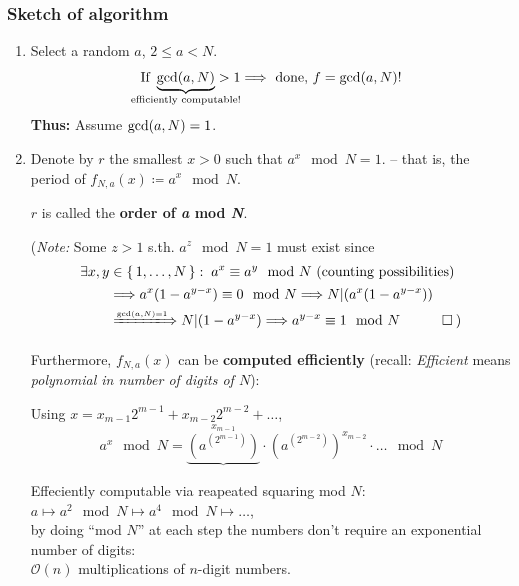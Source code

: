 \documentclass[a4paper, 12pt]{article}
\theoremstyle{plain}
\theoremstyle{definition}
\theoremstyle{remark}
\begin{document}
\subsubsection*{Sketch of algorithm}
\begin{enumerate}[label=(\arabic*)]
  \item Select a random $a$, $2\leq a<N$.
    \begin{equation*}
      \text{If } \underbrace{\textnormal{gcd}(a,N)}_{\mathclap{\text{efficiently computable!}}} > 1 \Longrightarrow \text{ done, } f=\textnormal{gcd}(a,N)!
    \end{equation*}
    \textbf{Thus:} Assume $\textnormal{gcd}(a,N)=1$.
  \item Denote by $r$ the smallest $x>0$ such that $a^x \mod N = 1$.
    -- that is, the period of $f_{N,a}(x)\coloneq a^x \mod N$.

    $r$ is called the \textbf{order of \emph{a} mod \emph{N}}.

    (\emph{Note:} Some $z>1$ s.th. $a^z \mod N = 1$ must exist since
      \begin{align*}
        \exists x,y &\in \set{1,\ldots,N}:\; a^x \equiv a^y \mod N \text{ (counting possibilities)}\\
        &\Longrightarrow a^x(1-a^{y-x}) \equiv 0 \mod N \Longrightarrow N|(a^x(1-a^{y-x})) \\
      &\xLongrightarrow{\scriptscriptstyle\textnormal{gcd}(a,N)=1} N|(1-a^{y-x}) \Longrightarrow a^{y-x} \equiv 1 \mod N\quad \qed \: )
    \end{align*}

    Furthermore, $f_{N,a}(x)$ can be \textbf{computed efficiently} (recall: \emph{Efficient} means \emph{polynomial in number of digits of $N$}):

    Using $x = x_{m-1}2^{m-1}+x_{m-2}2^{m-2}+\ldots$,
    \begin{equation*}
      a^x \mod N = {\underbrace{(a^{(2^{m-1})})}}^{x_{m-1}}\cdot (a^{(2^{m-2})})^{x_{m-2}}\cdot \ldots \mod N
    \end{equation*}
    \begin{center}
      Effeciently computable via reapeated squaring mod $N$:\\
      $a \mapsto a^2 \mod N \mapsto a^4 \mod N \mapsto \ldots$,\\
      by doing \enquote{mod $N$} at each step the numbers don't require an exponential number of digits:\\
      $\mathcal{O}(n)$ multiplications of $n$-digit numbers.
    \end{center}


\end{enumerate}
\end{document}
